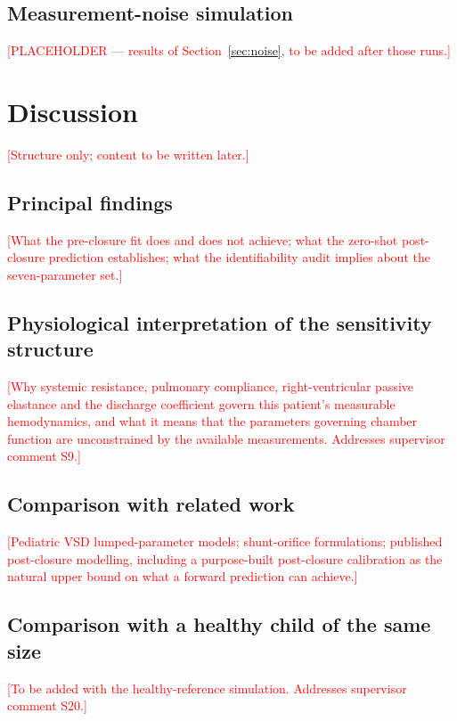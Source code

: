 \subsection{Measurement-noise simulation}
\label{sec:results_noise}
\textcolor{red}{[PLACEHOLDER --- results of Section~\ref{sec:noise}, to be added after those runs.]}

\section{Discussion}
\label{sec:discussion}
\textcolor{red}{[Structure only; content to be written later.]}

\subsection{Principal findings}
\textcolor{red}{[What the pre-closure fit does and does not achieve; what the zero-shot post-closure prediction establishes; what the identifiability audit implies about the seven-parameter set.]}

\subsection{Physiological interpretation of the sensitivity structure}
\textcolor{red}{[Why systemic resistance, pulmonary compliance, right-ventricular passive elastance and the discharge coefficient govern this patient's measurable hemodynamics, and what it means that the parameters governing chamber function are unconstrained by the available measurements. Addresses supervisor comment S9.]}

\subsection{Comparison with related work}
\textcolor{red}{[Pediatric VSD lumped-parameter models; shunt-orifice formulations; published post-closure modelling, including a purpose-built post-closure calibration as the natural upper bound on what a forward prediction can achieve.]}

\subsection{Comparison with a healthy child of the same size}
\textcolor{red}{[To be added with the healthy-reference simulation. Addresses supervisor comment S20.]}


